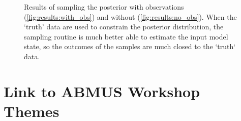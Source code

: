 \documentclass[runningheads]{llncs}
\begin{document}


\begin{figure}%
\centering
{}
\caption{Results of sampling the posterior with observations (\ref{fig:results:with_obs}) and without (\ref{fig:results:no_obs}). When the `truth' data are used to constrain the posterior distribution, the sampling routine is much better able to estimate the input model state, so the outcomes of the samples are much closed to the `truth` data.} 
\label{fig:model_uncertainty}
\end{figure}


\section{Link to ABMUS Workshop Themes}
\end{document}
